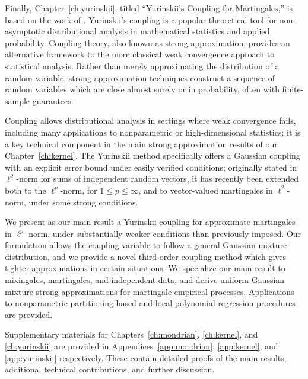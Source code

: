 Finally, Chapter~\ref{ch:yurinskii}, titled ``Yurinskii's Coupling for
Martingales,'' is based on the work of \citet{cattaneo2022yurinskii}.
Yurinskii's coupling is a popular theoretical tool for non-asymptotic
distributional analysis in mathematical statistics and applied probability.
Coupling theory, also known as strong approximation, provides an alternative
framework to the more classical weak convergence approach to statistical
analysis. Rather than merely approximating the distribution of a random
variable, strong approximation techniques construct a sequence of random
variables which are close almost surely or in probability, often with
finite-sample guarantees.

Coupling allows distributional analysis in settings where weak convergence
fails, including many applications to nonparametric or high-dimensional
statistics; it is a key technical component in the main strong approximation
results of our Chapter~\ref{ch:kernel}. The Yurinskii method specifically
offers a Gaussian coupling with an explicit error bound under easily verified
conditions; originally stated in $\ell^2$-norm for sums of independent random
vectors, it has recently been extended both to the $\ell^p$-norm, for $1 \leq p
\leq \infty$, and to vector-valued martingales in $\ell^2$-norm, under some
strong conditions.

We present as our main result a Yurinskii coupling for approximate martingales
in $\ell^p$-norm, under substantially weaker conditions than previously
imposed. Our formulation allows the coupling variable to follow a
general Gaussian mixture distribution, and we provide a novel third-order
coupling method which gives tighter approximations in certain situations. We
specialize our main result to mixingales, martingales, and independent data,
and derive uniform Gaussian mixture strong approximations for martingale
empirical processes. Applications to nonparametric partitioning-based and local
polynomial regression procedures are provided.

Supplementary materials for Chapters~\ref{ch:mondrian}, \ref{ch:kernel}, and
\ref{ch:yurinskii} are provided in Appendices~\ref{app:mondrian},
\ref{app:kernel}, and \ref{app:yurinskii} respectively. These contain detailed
proofs of the main results, additional technical contributions, and further
discussion.
